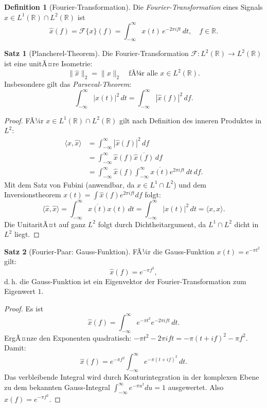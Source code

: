 ﻿\documentclass[a4paper,12pt]{article}
\theoremstyle{definition}
\newtheorem{definition}{Definition}
\newtheorem{satz}{Satz}
\begin{document}
\begin{definition}[Fourier-Transformation]
\label{def:fourier}
Die \emph{Fourier-Transformation} eines Signals $x \in L^1(\mathbb{R}) \cap L^2(\mathbb{R})$
ist
\[
\hat{x}(f) = \mathcal{F}\{x\}(f) = \int_{-\infty}^{\infty} x(t) \, e^{-2\pi i f t} \, dt, \quad f \in \mathbb{R}.
\]
\end{definition}

\begin{satz}[Plancherel-Theorem]
\label{satz:plancherel}
Die Fourier-Transformation $\mathcal{F}: L^2(\mathbb{R}) \to L^2(\mathbb{R})$
ist eine unitÃ¤re Isometrie:
\[
\|\hat{x}\|_2 = \|x\|_2 \quad \text{fÃ¼r alle } x \in L^2(\mathbb{R}).
\]
Insbesondere gilt das \emph{Parseval-Theorem}:
\[
\int_{-\infty}^{\infty} |x(t)|^2 \, dt = \int_{-\infty}^{\infty} |\hat{x}(f)|^2 \, df.
\]
\end{satz}

\begin{proof}
FÃ¼r $x \in L^1(\mathbb{R}) \cap L^2(\mathbb{R})$ gilt nach Definition des inneren
Produktes in $L^2$:
\begin{align*}
\langle \hat{x}, \hat{x} \rangle
&= \int_{-\infty}^{\infty} |\hat{x}(f)|^2 \, df \\
&= \int_{-\infty}^{\infty} \hat{x}(f) \overline{\hat{x}(f)} \, df \\
&= \int_{-\infty}^{\infty} \hat{x}(f) \int_{-\infty}^{\infty} \overline{x(t)} e^{2\pi i f t} \, dt \, df.
\end{align*}
Mit dem Satz von Fubini (anwendbar, da $x \in L^1 \cap L^2$) und
dem Inversionstheorem $x(t) = \int \hat{x}(f) e^{2\pi i ft} df$ folgt:
\[
\langle \hat{x}, \hat{x} \rangle = \int_{-\infty}^{\infty} \overline{x(t)} x(t) \, dt
= \int_{-\infty}^{\infty} |x(t)|^2 \, dt = \langle x, x \rangle.
\]
Die UnitaritÃ¤t auf ganz $L^2$ folgt durch Dichtheitargument, da
$L^1 \cap L^2$ dicht in $L^2$ liegt.
\end{proof}

\begin{satz}[Fourier-Paar: Gauss-Funktion]
\label{satz:gauss}
FÃ¼r die Gauss-Funktion $x(t) = e^{-\pi t^2}$ gilt:
\[
\hat{x}(f) = e^{-\pi f^2},
\]
d.\,h. die Gauss-Funktion ist ein Eigenvektor der Fourier-Transformation zum
Eigenwert $1$.
\end{satz}

\begin{proof}
Es ist
\[
\hat{x}(f) = \int_{-\infty}^{\infty} e^{-\pi t^2} e^{-2\pi i ft} \, dt.
\]
ErgÃ¤nze den Exponenten quadratisch:
$-\pi t^2 - 2\pi i ft = -\pi(t + if)^2 - \pi f^2$.
Damit:
\[
\hat{x}(f) = e^{-\pi f^2} \int_{-\infty}^{\infty} e^{-\pi(t+if)^2} \, dt.
\]
Das verbleibende Integral wird durch Konturintegration in der komplexen Ebene zu
dem bekannten Gauss-Integral $\int_{-\infty}^{\infty} e^{-\pi u^2} du = 1$ ausgewertet.
Also $\hat{x}(f) = e^{-\pi f^2}$.
\end{proof}
\end{document}
